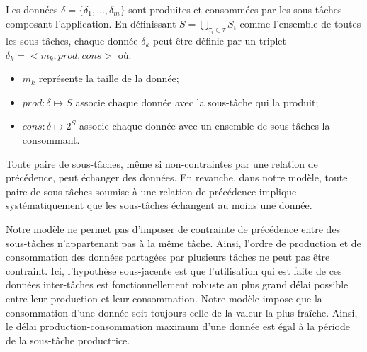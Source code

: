 \documentclass[main.tex]{subfiles}
\begin{document}
Les données $\delta = \{ \delta_1 , \ldots , \delta_m \}$ sont produites et consommées par les sous-tâches composant l'application. En définissant $S = \underset{\tau_i \in \tau}{\bigcup} S_i$ comme l'ensemble de toutes les sous-tâches, chaque donnée $\delta_k$ peut être définie par un triplet $\delta_k = <m_k , prod, cons>$ où:
\begin{itemize}
    \item $m_k$ représente la taille de la donnée;
    \item $prod : \delta \mapsto S$ associe chaque donnée avec la sous-tâche qui la produit;
    \item $cons : \delta \mapsto 2^S$ associe chaque donnée avec un ensemble de sous-tâches la consommant.
\end{itemize}

Toute paire de sous-tâches, même si non-contraintes par une relation de précédence, peut échanger des données. En revanche, dans notre modèle, toute paire de sous-tâches soumise à une relation de précédence implique systématiquement que les sous-tâches échangent au moins une donnée.

Notre modèle ne permet pas d'imposer de contrainte de précédence entre des sous-tâches n'appartenant pas à la même tâche. Ainsi, l'ordre de production et de consommation des données partagées par plusieurs tâches ne peut pas être contraint. Ici, l'hypothèse sous-jacente est que l'utilisation qui est faite de ces données inter-tâches est fonctionnellement robuste au plus grand délai possible entre leur production et leur consommation. Notre modèle impose que la consommation d'une donnée soit toujours celle de la valeur la plus fraîche. Ainsi, le délai production-consommation maximum d'une donnée est égal à la période de la sous-tâche productrice.
\end{document}
